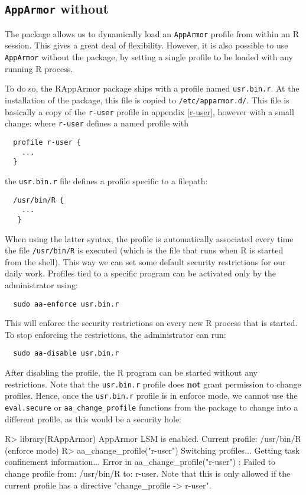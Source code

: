 \documentclass{jss}
\newcommand{\R}{\textsf{R}\xspace}
\newcommand{\AppArmor}{\texttt{AppArmor}\xspace}
\newcommand{\RAppArmor}{\pkg{RAppArmor}\xspace}
\begin{document}
\subsection[AppArmor without RAppArmor]{\AppArmor without \RAppArmor}
\label{usr.bin.r}

The \RAppArmor package allows us to dynamically load an \AppArmor profile from
within an \R session. This gives a great deal of flexibility. However, it is
also possible to use \AppArmor without the \RAppArmor package, by setting a
single profile to be loaded with any running \R process.

To do so, the RAppArmor package ships with a profile named \texttt{usr.bin.r}.
At the installation of the package, this file is copied to
\texttt{/etc/apparmor.d/}. This file is basically a copy of the \texttt{r-user}
profile in appendix \ref{r-user}, however with a small change: where
\texttt{r-user} defines a named profile with
\begin{verbatim}
  profile r-user {
    ...
  }
\end{verbatim}
the \texttt{usr.bin.r} file defines a profile specific to a filepath:
\begin{verbatim}
  /usr/bin/R {
    ...
   }
\end{verbatim}

When using the latter syntax, the profile is automatically associated every
time the file \texttt{/usr/bin/R} is executed (which is the file that runs when
\R is started from the shell). This way we can set some default security
restrictions for our daily work. Profiles tied to a specific program can be
activated only by the administrator using:
\begin{verbatim}
  sudo aa-enforce usr.bin.r
\end{verbatim}
This will enforce the security restrictions on every new \R process that is
started. To stop enforcing the restrictions, the administrator can run:
\begin{verbatim}
  sudo aa-disable usr.bin.r
\end{verbatim}
After disabling the profile, the \R program can be started without any
restrictions.
Note that the \texttt{usr.bin.r} profile does \textbf{not} grant permission to
change profiles. Hence, once the \texttt{usr.bin.r} profile is in enforce mode,
we cannot use the \texttt{eval.secure} or \texttt{aa\_change\_profile} functions
from the \RAppArmor package to change into a different profile, as this
would be a security hole:

\begin{CodeChunk}
\begin{CodeInput}
R> library(RAppArmor)
AppArmor LSM is enabled.
Current profile: /usr/bin/R (enforce mode)
R> aa_change_profile("r-user")
Switching profiles...
Getting task confinement information...
Error in aa_change_profile("r-user") : 
  Failed to change profile from: /usr/bin/R to: r-user.
  Note that this is only allowed if the current profile has a
  directive "change_profile -> r-user".
\end{CodeInput}
\end{CodeChunk}
\end{document}
